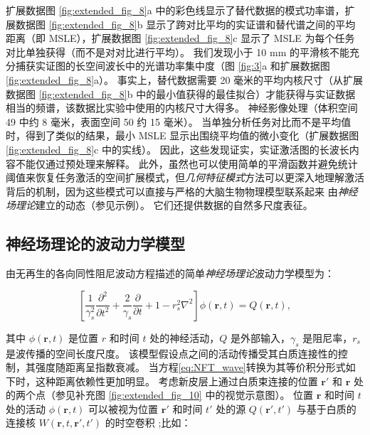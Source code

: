 \documentclass[lang=cn,a4paper,newtx,citestyle=gb7714-2015, bibstyle=gb7714-2015]{elegantpaper}
\begin{document}
扩展数据图 \ref{fig:extended_fig_8}a 中的彩色线显示了替代数据的模式功率谱，扩展数据图 \ref{fig:extended_fig_8}b 显示了跨对比平均的实证谱和替代谱之间的平均距离（即 MSLE），扩展数据图 \ref{fig:extended_fig_8}c 显示了 MSLE 为每个任务对比单独获得（而不是对对比进行平均）。
我们发现小于 10 mm 的平滑核不能充分捕获实证图的长空间波长中的光谱功率集中度（图 \ref{fig:3}a 和扩展数据图 \ref{fig:extended_fig_8}a）。
事实上，替代数据需要 20 毫米的平均内核尺寸（从扩展数据图 \ref{fig:extended_fig_8}b 中的最小值获得的最佳拟合）才能获得与实证数据相当的频谱，该数据比实验中使用的内核尺寸大得多。
神经影像处理（体积空间 49 中约 8 毫米，表面空间 50 约 15 毫米）。
当单独分析任务对比而不是平均值时，得到了类似的结果，最小 MSLE 显示出围绕平均值的微小变化（扩展数据图 \ref{fig:extended_fig_8}c 中的实线）。
因此，这些发现证实，实证激活图的长波长内容不能仅通过预处理来解释。
此外，虽然也可以使用简单的平滑函数并避免统计阈值来恢复任务激活的空间扩展模式，但\textit{几何特征模式}方法可以更深入地理解激活背后的机制，因为这些模式可以直接与严格的大脑生物物理模型联系起来 由\textit{神经场理论}建立的动态（参见示例\cite{robinson1997propagation,robinson2016eigenmodes,jones1999golgi,wang2016brain}）。
它们还提供数据的自然多尺度表征。



\subsection{神经场理论的波动力学模型} \label{sec:NFT_wave}

由无再生的各向同性阻尼波动方程描述的简单\textit{神经场理论}波动力学模型为：

\begin{equation}\label{eq:NFT_wave}
	[\frac{1}{\gamma_s^2} \frac{\partial ^2}{\partial t^2} +
	\frac{2}{\gamma_s} \frac{\partial}{\partial t} + 
	1 - r_s^2 \nabla^2
	]
	\phi(\boldsymbol{r}, t)
	= Q(\boldsymbol{r}, t),
\end{equation}


其中 $ \phi(\boldsymbol{r},t) $ 是位置 $ r $ 和时间 $ t $ 处的神经活动，$ Q $ 是外部输入，$ \gamma_s $ 是阻尼率，$ r_s $ 是波传播的空间长度尺度。
该模型假设点之间的活动传播受其白质连接性的控制，其强度随距离呈指数衰减。
当方程\ref{eq:NFT_wave}转换为其等价积分形式如下时，这种距离依赖性更加明显。
考虑新皮层上通过白质束连接的位置 $ \boldsymbol{r}' $ 和 $ \boldsymbol{r} $ 处的两个点（参见补充图 \ref{fig:extended_fig_10} 中的视觉示意图）。
位置 $ \boldsymbol{r} $ 和时间 $ t $ 处的活动 $ \phi(\boldsymbol{r},t) $ 可以被视为位置 $ \boldsymbol{r}' $ 和时间 $ t' $ 处的源 $ Q(\boldsymbol{r}',t') $ 与基于白质的连接核 $ W(\boldsymbol{r}, t, \boldsymbol{r}', t') $ 的时空卷积 ;比如：
\end{document}

